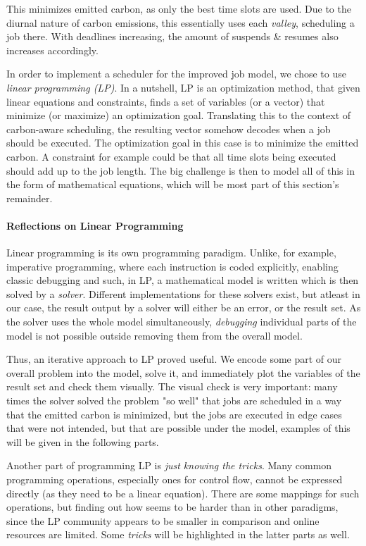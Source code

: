 This minimizes emitted carbon, as only the best time slots are used.
Due to the diurnal nature of carbon emissions, this essentially uses each \emph{valley}, scheduling a job there. 
With deadlines increasing, the amount of suspends \& resumes also increases accordingly.

In order to implement a scheduler for the improved job model, we chose to use \emph{linear programming (LP)}.
In a nutshell, LP is an optimization method, that given linear equations and constraints, finds a set of variables (or a vector) that minimize (or maximize) an optimization goal.
Translating this to the context of carbon-aware scheduling, the resulting vector somehow decodes when a job should be executed.
The optimization goal in this case is to minimize the emitted carbon. 
A constraint for example could be that all time slots being executed should add up to the job length. 
The big challenge is then to model all of this in the form of mathematical equations, which will be most part of this section's remainder.

\paragraph{Reflections on Linear Programming}

Linear programming is its own programming paradigm. Unlike, for example, imperative programming, where each instruction is coded explicitly, enabling classic debugging and such, in LP, a mathematical model is written which is then solved by a \emph{solver}. 
Different implementations for these solvers exist, but atleast in our case, the result output by a solver will either be an error, or the result set. 
As the solver uses the whole model simultaneously, \emph{debugging} individual parts of the model is not possible outside removing them from the overall model.

Thus, an iterative approach to LP proved useful. 
We encode some part of our overall problem into the model, solve it, and immediately plot the variables of the result set and check them visually.
The visual check is very important: many times the solver solved the problem "so well" that jobs are scheduled in a way that the emitted carbon is minimized, but the jobs are executed in edge cases that were not intended, but that are possible under the model, examples of this will be given in the following parts.

Another part of programming LP is \emph{just knowing the tricks}. 
Many common programming operations, especially ones for control flow, cannot be expressed directly (as they need to be a linear equation).
There are some mappings for such operations, but finding out how seems to be harder than in other paradigms, since the LP community appears to be smaller in comparison and online resources are limited.
Some \emph{tricks} will be highlighted in the latter parts as well. 

